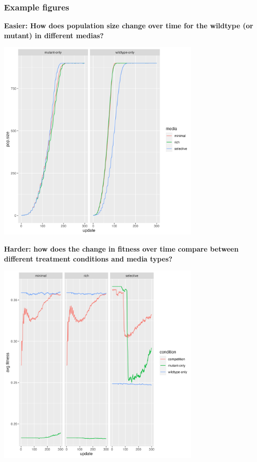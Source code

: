 \documentclass[
  letterpaper,
  DIV=11,
  numbers=noendperiod]{scrreprt}
\begin{document}
\begin{tcolorbox}
\subsubsection{Example figures}

\textbf{Easier: How does population size change over time for the
wildtype (or mutant) in different medias?}

\includegraphics[width=0.75\textwidth,height=\textheight]{scripts/04_projects/project-day-2_files/figs/avida-easy.png}

\textbf{Harder: how does the change in fitness over time compare between
different treatment conditions and media types?}

\includegraphics[width=0.75\textwidth,height=\textheight]{scripts/04_projects/project-day-2_files/figs/avida-hard.png}

\end{tcolorbox}
\end{document}
